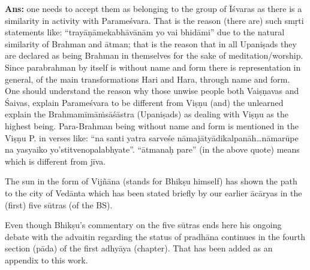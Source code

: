 \vskip 2pt

\textbf{Ans:} one needs to accept them as belonging to the group of Īśvaras as there is a similarity in activity with Parameśvara. That is the reason (there are) such smṛti statements like: “trayāṇāmekabhāvānām yo vai bhidāmi” due to the natural similarity of Brahman and ātman; that is the reason that in all Upaniṣads they are declared as being Brahman in themselves for the sake of meditation/worship. Since parabrahman by itself is without name and form there is representation in general, of the main transformations Hari and Hara, through name and form. One should understand the reason why those unwise people both  Vaiṣṇavas and Śaivas, explain Parameśvara to be different from Viṣṇu (and) the unlearned explain the Brahmamīmāṁsāśāstra (Upaniṣads) as dealing with Viṣṇu as the highest being. Para-Brahman being without name and form is mentioned in the Viṣṇu P. in verses like: “na santi yatra sarveśe nāmajātyādikalpanāh…nāmarūpe na yasyaiko yo’stitvenopalabhyate”. “ātmanaḥ pare” (in the above quote) means which is different from jīva.

\newpage

The sun in the form of Vijñāna (stands for Bhikṣu himself) has shown the path to the city of Vedānta which has been stated briefly by our earlier ācāryas in the (first) five sūtras (of the BS).

Even though Bhikṣu’s commentary on the five sūtras ends here his ongoing debate with the advaitin regarding the status of pradhāna continues in the fourth section (pāda) of the first adhyāya (chapter).  That has been added as an appendix to this work.
